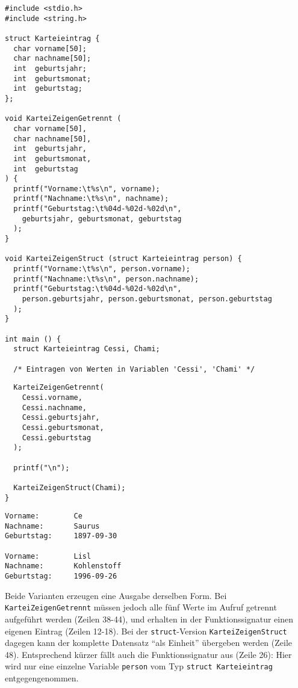 \begin{codebox}
\begin{verbatim}
#include <stdio.h>
#include <string.h>

struct Karteieintrag {
  char vorname[50];
  char nachname[50];
  int  geburtsjahr;
  int  geburtsmonat;
  int  geburtstag;
};

void KarteiZeigenGetrennt (
  char vorname[50],
  char nachname[50],
  int  geburtsjahr,
  int  geburtsmonat,
  int  geburtstag
) {
  printf("Vorname:\t%s\n", vorname);
  printf("Nachname:\t%s\n", nachname);
  printf("Geburtstag:\t%04d-%02d-%02d\n",
    geburtsjahr, geburtsmonat, geburtstag
  );
}

void KarteiZeigenStruct (struct Karteieintrag person) {
  printf("Vorname:\t%s\n", person.vorname);
  printf("Nachname:\t%s\n", person.nachname);
  printf("Geburtstag:\t%04d-%02d-%02d\n",
    person.geburtsjahr, person.geburtsmonat, person.geburtstag
  );
}

int main () {
  struct Karteieintrag Cessi, Chami;

  /* Eintragen von Werten in Variablen 'Cessi', 'Chami' */
\end{verbatim}
\end{codebox}
\begin{codebox}[]
\begin{verbatim}
  KarteiZeigenGetrennt(
    Cessi.vorname,
    Cessi.nachname,
    Cessi.geburtsjahr,
    Cessi.geburtsmonat,
    Cessi.geburtstag
  );

  printf("\n");

  KarteiZeigenStruct(Chami);
}
\end{verbatim}
\end{codebox}

\begin{cmdbox}
\begin{verbatim}
Vorname:        Ce
Nachname:       Saurus
Geburtstag:     1897-09-30

Vorname:        Lisl
Nachname:       Kohlenstoff
Geburtstag:     1996-09-26
\end{verbatim}
\end{cmdbox}

Beide Varianten erzeugen eine Ausgabe derselben Form. Bei \texttt{KarteiZeigenGetrennt} müssen jedoch alle fünf Werte im Aufruf getrennt aufgeführt werden (Zeilen 38-44), und erhalten in der Funktionssignatur einen eigenen Eintrag (Zeilen 12-18). Bei der \texttt{struct}-Version \texttt{KarteiZeigenStruct} dagegen kann der komplette Datensatz \enquote{als Einheit} übergeben werden (Zeile 48). Entsprechend kürzer fällt auch die Funktionssignatur aus (Zeile 26): Hier wird nur eine einzelne Variable \texttt{person} vom Typ \texttt{struct Karteieintrag} entgegengenommen.

